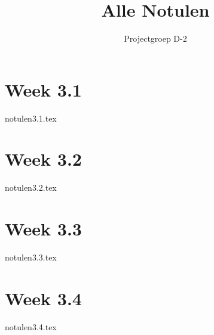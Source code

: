 \documentclass{report}
\title{Alle Notulen}
\author{Projectgroep D-2}
\begin{document}
\maketitle
\tableofcontents

\chapter{Week 3.1}
{notulen3.1.tex}
\chapter{Week 3.2}
{notulen3.2.tex}
\chapter{Week 3.3}
{notulen3.3.tex}
\chapter{Week 3.4}
{notulen3.4.tex}
\end{document}

